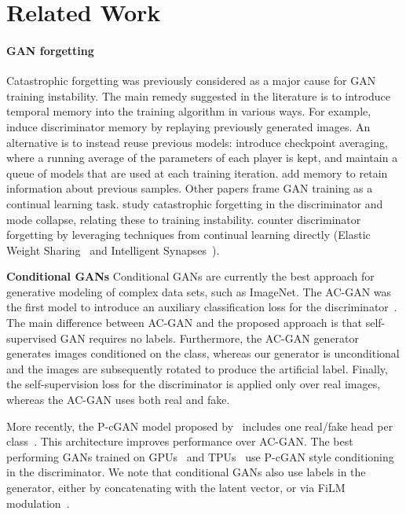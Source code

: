 \documentclass[10pt,twocolumn,letterpaper]{article}
\begin{document}
 \section{Related Work}

\paragraph{GAN forgetting}
Catastrophic forgetting was previously considered as a major cause for GAN training instability.
The main remedy suggested in the literature is to introduce temporal memory into the training algorithm in various ways.
For example, \citet{grnarova2017online} induce discriminator memory by replaying previously generated images.
An alternative is to instead reuse previous models: \citet{salimans2016improved} introduce checkpoint averaging, where a running average of the parameters of each player is kept, and \citet{grnarova2017online} maintain a queue of models that are used at each training iteration.
\citet{kim2018memorization} add memory to retain information about previous samples.
Other papers frame GAN training as a continual learning task.
\citet{thanh2018catastrophic} study catastrophic forgetting in the discriminator and mode collapse, relating these to training instability.
\citet{anonymous2019generative} counter discriminator forgetting by leveraging techniques from continual learning directly (Elastic Weight Sharing~\cite{kirkpatrick2017overcoming} and Intelligent Synapses~\citep{zenke2017continual}).

\vspace{3mm}
\noindent\textbf{Conditional GANs}\quad
Conditional GANs are currently the best approach for generative modeling of complex data sets, such as ImageNet.
The AC-GAN was the first model to introduce an auxiliary classification loss for the discriminator~\citep{odena2017}. The main difference between AC-GAN and the proposed approach is that self-supervised GAN requires no labels. Furthermore, the AC-GAN generator generates images conditioned on the class, whereas our generator is unconditional and the images are subsequently rotated to produce the artificial label. Finally, the self-supervision loss for the discriminator is applied only over real images, whereas the AC-GAN uses both real and fake.

More recently, the P-cGAN model proposed by~\citet{miyato2018cgans} includes one real/fake head per class~\citep{miyato2018cgans}. This architecture improves performance over AC-GAN. The best performing GANs trained on GPUs~\citep{zhang2018self} and TPUs~\citep{brock2018large} use P-cGAN style conditioning in the discriminator. We note that conditional GANs also use labels in the generator, either by concatenating with the latent vector, or via FiLM modulation~\citep{de2017modulating}.
\end{document}
